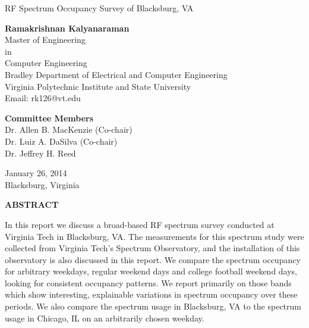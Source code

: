 \documentclass[12pt,sts]{report}
\begin{document}
\thispagestyle{empty}
\begin{center}

{\Large 
RF Spectrum Occupancy Survey of Blacksburg, VA
}

\vfill

\textbf{Ramakrishnan Kalyanaraman} \\
Master of Engineering \\
in \\
Computer Engineering \\
Bradley Department of Electrical and Computer Engineering \\
Virginia Polytechnic Institute and State University \\
Email: rk126@vt.edu

\vfill

\textbf{Committee Members} \\
Dr. Allen B. MacKenzie (Co-chair) \\
Dr. Luiz A. DaSilva (Co-chair) \\
Dr. Jeffrey H. Reed

\vfill

January 26, 2014 \\
Blacksburg, Virginia

\end{center}

\pagebreak

\thispagestyle{empty}

\begin{center}

\textbf{ABSTRACT}

\end{center}

In this report we discuss a broad-based RF spectrum survey conducted at Virginia Tech in Blacksburg, VA. The measurements for this spectrum study were collected from Virginia Tech's Spectrum Observatory, and the installation of this observatory is also discussed in this report. We compare the spectrum occupancy for arbitrary weekdays, regular weekend days and college football weekend days, looking for consistent occupancy patterns. We report primarily on those bands which show interesting, explainable variations in spectrum occupancy over these periods. We also compare the spectrum usage in Blacksburg, VA to the spectrum usage in Chicago, IL on an arbitrarily chosen weekday.
\end{document}
